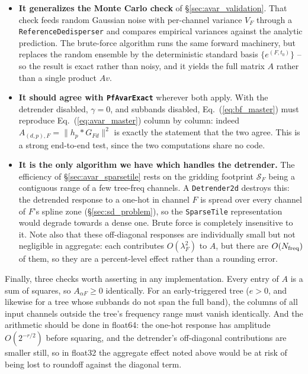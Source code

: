 \documentclass{article}
\numberwithin{equation}{section}   %
\begin{document}
\begin{itemize}

\item {\bf It generalizes the Monte Carlo check} of \S\ref{sec:avar_validation}. That check feeds
random Gaussian noise with per-channel variance $V_F$ through a {\tt ReferenceDedisperser} and
compares empirical variances against the analytic prediction. The brute-force algorithm runs the
same forward machinery, but replaces the random ensemble by the deterministic standard basis
$\{e^{(F,t_0)}\}$ -- so the result is exact rather than noisy, and it yields the full matrix $A$
rather than a single product $Av$.

\item {\bf It should agree with {\tt PfAvarExact}} wherever both apply. With the detrender
disabled, $\gamma=0$, and subbands disabled, Eq.\ (\ref{eq:bf_master}) must reproduce
Eq.\ (\ref{eq:avar_master}) column by column: indeed $A_{(d,p),F} = \|h_p * G_{Fd}\|^2$ is exactly
the statement that the two agree. This is a strong end-to-end test, since the two computations
share no code.

\item {\bf It is the only algorithm we have which handles the detrender.} The efficiency of
\S\ref{sec:avar_sparsetile} rests on the gridding footprint ${\mathcal S}_F$ being a contiguous
range of a few tree-freq channels. A {\tt Detrender2d} destroys this: the detrended response to a
one-hot in channel $F$ is spread over every channel of $F$'s spline zone (\S\ref{sec:sd_problem}),
so the {\tt SparseTile} representation would degrade towards a dense one. Brute force is completely
insensitive to it. Note also that these off-diagonal responses are individually small but not
negligible in aggregate: each contributes $O(\lambda_F^2)$ to $A$, but there are $O(N_{\rm freq})$
of them, so they are a percent-level effect rather than a rounding error.

\end{itemize}
\par\noindent
Finally, three checks worth asserting in any implementation. Every entry of $A$ is a sum of
squares, so $A_{\alpha F} \ge 0$ identically. For an early-triggered tree ($e>0$, and likewise for
a tree whose subbands do not span the full band), the columns of all input channels outside the
tree's frequency range must vanish identically. And the arithmetic should be done in float64: the
one-hot response has amplitude $O(2^{-r/2})$ before squaring, and the detrender's off-diagonal
contributions are smaller still, so in float32 the aggregate effect noted above would be at risk of
being lost to roundoff against the diagonal term.
\end{document}
